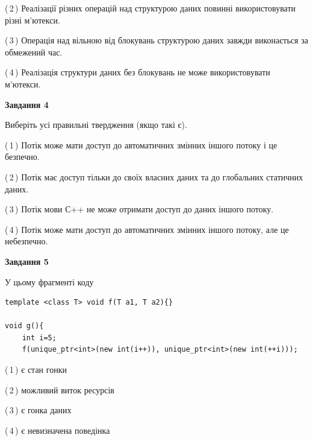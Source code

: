 \documentclass[12pt, ukrainian]{article}
\begin{document}
\begin {large}
{(\,2\,) Реалізації різних операцій над структурою даних повинні використовувати різні м’ютекси.%

(\,3\,) Операція над вільною від блокувань структурою даних завжди виконається за обмежений час.%

(\,4\,) Реалізація структури даних без блокувань не може використовувати м’ютекси.%



\begin{center}
\textbf{Завдання 4}
\end{center}
Виберіть усі правильні твердження (якщо такі є).\par
\vspace{2mm}

(\,1\,) Потік може мати доступ до автоматичних змінних іншого потоку і це безпечно.%

(\,2\,) Потік має доступ тільки до своїх власних даних та до глобальних статичних даних.%

(\,3\,) Потік мови С++ не може отримати доступ до даних іншого потоку.%

(\,4\,) Потік може мати доступ до автоматичних змінних іншого потоку, але це небезпечно.%



\begin{center}
\textbf{Завдання 5}
\end{center}
У цьому фрагменті коду
\begin{verbatim}
template <class T> void f(T a1, T a2){}

void g(){
    int i=5;
    f(unique_ptr<int>(new int(i++)), unique_ptr<int>(new int(++i)));
\end{verbatim}

(\,1\,) є стан гонки%

(\,2\,) можливий виток ресурсів%

(\,3\,) є гонка даних%

(\,4\,) є невизначена поведінка%


}
\end {large}
\end{document}
